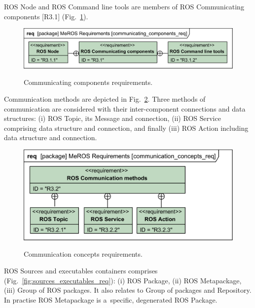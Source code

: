 \documentclass[11pt,oneside,a4paper]{report}
\begin{document}
	 ROS Node and ROS Command line tools are members of ROS Communicating components [R3.1]  (Fig.~\ref{fig:communicating_components_req}).

	\begin{figure}[H]
		\centering
		\begin{center}
			{\includegraphics[scale=1.0]{diagrams/communicating_components_req.png}}
		\end{center}
		\caption{Communicating components requirements.} 
		\label{fig:communicating_components_req}
	\end{figure}
	
	Communication methods are depicted in Fig.~\ref{fig:communication_concepts_req}.
	 Three methods of communication are considered with their inter-component connections and data structures: (i) ROS Topic, its Message and connection, (ii) ROS Service comprising data structure and connection, and finally (iii) ROS Action including data structure and connection.
	
	\begin{figure}[H]
		\centering
		\begin{center}
			{\includegraphics[scale=.98]{diagrams/communication_concepts_req.png}}
		\end{center}
		\caption{Communication concepts requirements.} 
		\label{fig:communication_concepts_req}
	\end{figure}
	
	ROS Sources and executables containers comprises (Fig.~\ref{fig:sources_executables_req}): (i) ROS Package, (ii) ROS Metapackage, (iii) Group of ROS packages. It also relates to Group of packages and Repository. In practise ROS Metapackage is a~specific, degenerated ROS Package.
	
\end{document}
